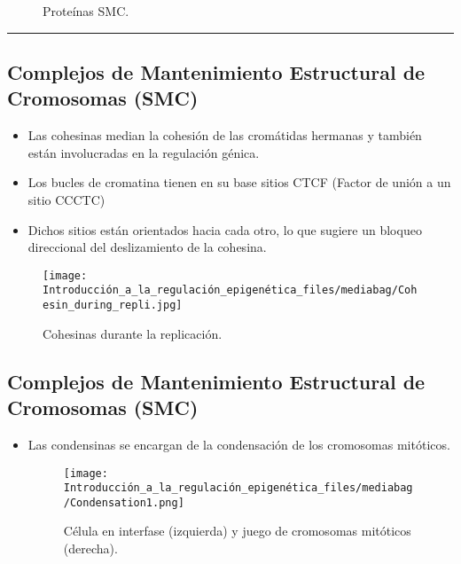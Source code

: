 \documentclass[
  letterpaper,
  DIV=11,
  numbers=noendperiod]{scrartcl}
\providecommand{\tightlist}{%
  \setlength{\itemsep}{0pt}\setlength{\parskip}{0pt}}\usepackage{longtable,booktabs,array}
\begin{document}
\begin{figure}[H]

{\centering 

}

\caption{Proteínas SMC.}

\end{figure}%

\begin{center}\rule{0.5\linewidth}{0.5pt}\end{center}

\subsection{Complejos de Mantenimiento Estructural de Cromosomas
(SMC)}\label{complejos-de-mantenimiento-estructural-de-cromosomas-smc-1}

\begin{itemize}
\tightlist
\item
  Las cohesinas median la cohesión de las cromátidas hermanas y también
  están involucradas en la regulación génica.
\item
  Los bucles de cromatina tienen en su base sitios CTCF (Factor de unión
  a un sitio CCCTC)
\item
  Dichos sitios están orientados hacia cada otro, lo que sugiere un
  bloqueo direccional del deslizamiento de la cohesina.
\end{itemize}

\begin{figure}[H]

{\centering \texttt{[image: Introducción\_a\_la\_regulación\_epigenética\_files/mediabag/Cohesin\_during\_repli.jpg]}

}

\caption{Cohesinas durante la replicación.}

\end{figure}%

\subsection{Complejos de Mantenimiento Estructural de Cromosomas
(SMC)}\label{complejos-de-mantenimiento-estructural-de-cromosomas-smc-2}

\begin{itemize}
\item
  Las condensinas se encargan de la condensación de los cromosomas
  mitóticos.

  \begin{figure}[H]

  {\centering \texttt{[image: Introducción\_a\_la\_regulación\_epigenética\_files/mediabag/Condensation1.png]}

  }

  \caption{Célula en interfase (izquierda) y juego de cromosomas
  mitóticos (derecha).}

  \end{figure}%
\end{itemize}
\end{document}
